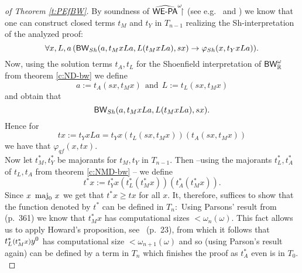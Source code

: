 \begin{proof}[ of Theorem \ref{t:PEfBW}]
By soundness of $\widehat{\textsf{\upshape WE-PA}}^\omega\!\!\!\restriction$ (see e.g.~\cite{Kohlenbach06} and 
\cite{streicherkohlenbach07}) we know that one can construct 
closed terms $t_M$ and $t_Y$ in $T_{n-1}$ realizing the Sh-interpretation 
of the analyzed proof:
\[
\forall x,L,a\, (\textsf{\upshape BW}_{Sh}(a,t_MxLa,L(t_MxLa),sx)\rightarrow\varphi_{Sh}(x,t_YxLa))
\text{.}
\]
Now, using the solution terms $t_A,t_L$ for the Shoenfield interpretation of 
$\textsf{\upshape BW}^{\omega}_{\mathbb{R}}$ from theorem \ref{c:ND-bw} we define 
\[ a:=t_A(sx,t_Mx) \ \ \mbox{and} \ \ L:=t_L(sx,t_Mx) \] 
and obtain that 
\[ \textsf{\upshape BW}_{Sh}(a,t_MxLa,L(t_MxLa),sx). \] 
Hence for 
\[ tx:=t_YxLa=t_Yx(t_L(sx,t_Mx))(t_A(sx,t_Mx)) \] 
we have that $\varphi_{qf}(x,tx).$
\\ Now let $t^*_M,t^*_Y$ be majorants for $t_M,t_Y$ in $T_{n-1}.$ 
Then --using the majorants $t^*_L,t^*_A$ of $t_L,t_A$ from theorem 
\ref{c:NMD-bw} -- we define 
\[ t^*x:=t^*_Yx(t^*_L(t^*_Mx))(t^*_A(t^*_Mx)). \] 
Since $x \ \operatorname{maj}_0 \, x$ we get that $t^*x\ge tx$ for all $x.$ It, therefore, 
suffices to show 
that the function denoted by $t^*$ can be defined in $T_n:$
Using Parsons' result
from \cite{Parsons71} (p.~361) we know that
$t^*_Mx$ has computational sizes $<\omega_{n}(\omega)$.
This fact allows us to apply Howard's proposition, see~\cite{Howard81} (p.~23),
from which it follows that $t^*_L\args{(t^*_Mx)}y^0$ has 
computational size $<\omega_{n+1}(\omega)$ and so (using Parson's result 
again) can be defined by a term in $T_n$ which finishes the proof as 
$t^*_A$ even is in $T_0.$\\
\end{proof}


